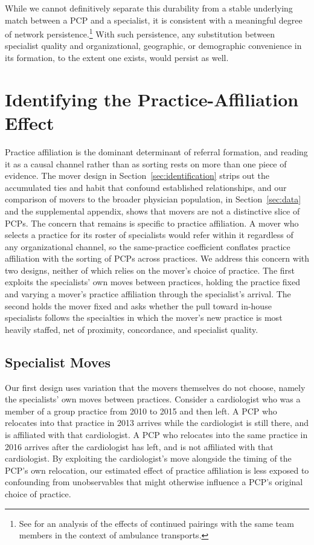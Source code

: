 \documentclass[12pt]{article}
\begin{document}
While we cannot definitively separate this durability from a stable underlying match between a PCP and a specialist, it is consistent with a meaningful degree of network persistence.\footnote{See \citet{aksin2021} for an analysis of the effects of continued pairings with the same team members in the context of ambulance transports.} With such persistence, any substitution between specialist quality and organizational, geographic, or demographic convenience in its formation, to the extent one exists, would persist as well.



\section{Identifying the Practice-Affiliation Effect}
\label{sec:practice-id}

Practice affiliation is the dominant determinant of referral formation, and reading it as a causal channel rather than as sorting rests on more than one piece of evidence. The mover design in Section~\ref{sec:identification} strips out the accumulated ties and habit that confound established relationships, and our comparison of movers to the broader physician population, in Section~\ref{sec:data} and the supplemental appendix, shows that movers are not a distinctive slice of PCPs. The concern that remains is specific to practice affiliation. A mover who selects a practice for its roster of specialists would refer within it regardless of any organizational channel, so the same-practice coefficient conflates practice affiliation with the sorting of PCPs across practices. We address this concern with two designs, neither of which relies on the mover's choice of practice. The first exploits the specialists' own moves between practices, holding the practice fixed and varying a mover's practice affiliation through the specialist's arrival. The second holds the mover fixed and asks whether the pull toward in-house specialists follows the specialties in which the mover's new practice is most heavily staffed, net of proximity, concordance, and specialist quality.

\subsection{Specialist Moves}
\label{sec:specmoves}

Our first design uses variation that the movers themselves do not choose, namely the specialists' own moves between practices. Consider a cardiologist who was a member of a group practice from 2010 to 2015 and then left. A PCP who relocates into that practice in 2013 arrives while the cardiologist is still there, and is affiliated with that cardiologist. A PCP who relocates into the same practice in 2016 arrives after the cardiologist has left, and is not affiliated with that cardiologist. By exploiting the cardiologist's move alongside the timing of the PCP's own relocation, our estimated effect of practice affiliation is less exposed to confounding from unobservables that might otherwise influence a PCP's original choice of practice.
\end{document}
